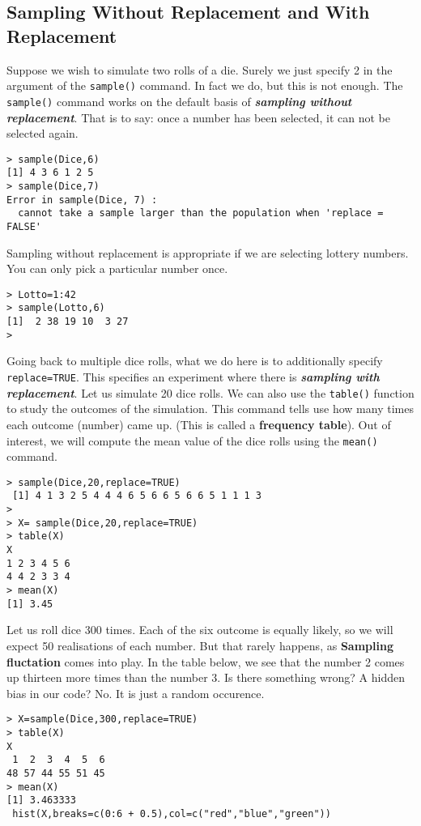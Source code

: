 \documentclass[11pt]{article} %
\begin{document}
\subsection{Sampling Without Replacement and With Replacement}
\noindent Suppose we wish to simulate two rolls of a die. Surely we just specify 2 in the argument of the \texttt{sample()} command. In fact we do, but this is not enough.
The \texttt{sample()} command works on the default basis of \textbf{\textit{sampling without replacement}}. That is to say: once a number has been selected, it can not be selected again.
\begin{verbatim}
> sample(Dice,6)
[1] 4 3 6 1 2 5
> sample(Dice,7)
Error in sample(Dice, 7) : 
  cannot take a sample larger than the population when 'replace = FALSE'
\end{verbatim}
Sampling without replacement is appropriate if we are selecting lottery numbers. You can only pick a particular number once.
\begin{verbatim}
> Lotto=1:42
> sample(Lotto,6)
[1]  2 38 19 10  3 27
> 
\end{verbatim}

Going back to multiple dice rolls, what we do here is to additionally specify \texttt{replace=TRUE}. This specifies an experiment where there is \textbf{\textit{sampling with replacement}}. Let us simulate 20 dice rolls. We can also use the \texttt{table()} function to study the outcomes of the simulation. This command tells use how many times each outcome (number) came up. (This is called a \textbf{frequency table}). Out of interest, we will compute the mean value of the dice rolls using the \texttt{mean()} command.
\begin{verbatim}
> sample(Dice,20,replace=TRUE)
 [1] 4 1 3 2 5 4 4 4 6 5 6 6 5 6 6 5 1 1 1 3
>
> X= sample(Dice,20,replace=TRUE)
> table(X)
X
1 2 3 4 5 6 
4 4 2 3 3 4 
> mean(X)
[1] 3.45
\end{verbatim}


Let us roll dice 300 times.  Each of the six outcome is equally likely,  so we will expect 50 realisations of each number.  But that rarely happens, as \textbf{Sampling fluctation} comes into play.
In the table below, we see that the number 2 comes up thirteen more times than the number 3. Is there something wrong? A hidden bias in our code? No. It is just a random occurence.

\begin{verbatim}
> X=sample(Dice,300,replace=TRUE)
> table(X)
X
 1  2  3  4  5  6 
48 57 44 55 51 45 
> mean(X)
[1] 3.463333
 hist(X,breaks=c(0:6 + 0.5),col=c("red","blue","green"))
\end{verbatim}
 
\end{document}
